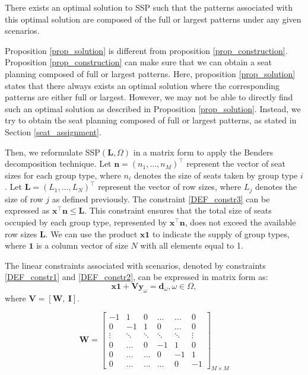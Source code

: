 \begin{prop}\label{prop_solution}
There exists an optimal solution to SSP such that the patterns associated with this optimal solution are composed of the full or largest patterns under any given scenarios.
\end{prop}

Proposition \ref{prop_solution} is different from proposition \ref{prop_construction}. Proposition \ref{prop_construction} can make sure that we can obtain a seat planning composed of full or largest patterns. Here, proposition \ref{prop_solution} states that there always exists an optimal solution where the corresponding patterns are either full or largest. However, we may not be able to directly find such an optimal solution as described in Proposition \ref{prop_solution}. Instead, we try to obtain the seat planning composed of full or largest patterns, as stated in Section \ref{seat_assignment}.

Then, we reformulate SSP$(\mathbf{L}, \Omega)$ in a matrix form to apply the Benders decomposition technique.
Let $\mathbf{n} = (n_1, \ldots, n_M)^{\intercal}$ represent the vector of seat sizes for each group type, where $n_i$ denotes the size of seats taken by group type $i$. Let $\mathbf{L} = (L_1, \ldots, L_N)^{\intercal}$ represent the vector of row sizes, where $L_j$ denotes the size of row $j$ as defined previously.
The constraint \eqref{DEF_constr3} can be expressed as $\mathbf{x}^{\intercal} \mathbf{n} \leq \mathbf{L}$. This constraint ensures that the total size of seats occupied by each group type, represented by $\mathbf{x}^{\intercal} \mathbf{n}$, does not exceed the available row sizes $\mathbf{L}$. We can use the product $\mathbf{x} \mathbf{1}$ to indicate the supply of group types, where $\mathbf{1}$ is a column vector of size $N$ with all elements equal to 1. 

The linear constraints associated with scenarios, denoted by constraints \eqref{DEF_constr1} and \eqref{DEF_constr2}, can be expressed in matrix form as:
\[\mathbf{x} \mathbf{1} + \mathbf{V} \mathbf{y}_\omega = \mathbf{d}_\omega, \omega\in \Omega,\]
where $\mathbf{V} = [\mathbf{W}, ~\mathbf{I}]$.

$$
\mathbf{W}=\left[\begin{array}{cccccc}
-1 & 1 & 0 & \ldots & \ldots & 0 \\
0 & -1 & 1 &    0   & \ldots & 0 \\
\vdots & \ddots & \ddots & \ddots & \ddots & \vdots \\
0  & \ldots   &  0  & -1 & 1 & 0 \\
0  & \ldots   &  \ldots  &  0 &  -1 & 1 \\
0 & \ldots & \ldots & \ldots & 0 & -1
\end{array}\right]_{M \times M}
$$

